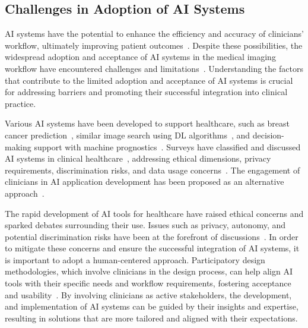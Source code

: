 \subsection{Challenges in Adoption of AI Systems}
\label{sec:chap004002002}

\ac{AI} systems have the potential to enhance the efficiency and accuracy of clinicians' workflow, ultimately improving patient outcomes~\cite{wallis2019artificial}.
Despite these possibilities, the widespread adoption and acceptance of \ac{AI} systems in the medical imaging workflow have encountered challenges and limitations~\cite{Fan2020}.
Understanding the factors that contribute to the limited adoption and acceptance of \ac{AI} systems is crucial for addressing barriers and promoting their successful integration into clinical practice.

Various \ac{AI} systems have been developed to support healthcare, such as breast cancer prediction~\cite{McKinney2020}, similar image search using \ac{DL} algorithms~\cite{10.1145/3290605.3300234}, and decision-making support with machine prognostics~\cite{10.1145/3290605.3300468}.
Surveys have classified and discussed \ac{AI} systems in clinical healthcare~\cite{CORONATO2020101964, LANGER2021106878, PELAU2021106855, STADIN2021106486}, addressing ethical dimensions, privacy requirements, discrimination risks, and data usage concerns~\cite{10.1145/3311957.3361858, PARK2021106795, DEANGELI2020102412}.
The engagement of clinicians in \ac{AI} application development has been proposed as an alternative approach~\cite{10.1145/3290605.3300234, CALISTO2021102607, Oh:2018:ILY:3173574.3174223, Sousa:2017:VVR:3025453.3025566}.

The rapid development of \ac{AI} tools for healthcare have raised ethical concerns and sparked debates surrounding their use.
Issues such as privacy, autonomy, and potential discrimination risks have been at the forefront of discussions~\cite{Fan2020, Sutton2020}.
In order to mitigate these concerns and ensure the successful integration of \ac{AI} systems, it is important to adopt a human-centered approach.
Participatory design methodologies, which involve clinicians in the design process, can help align \ac{AI} tools with their specific needs and workflow requirements, fostering acceptance and usability~\cite{CALISTO2021102607}.
By involving clinicians as active stakeholders, the development, and implementation of \ac{AI} systems can be guided by their insights and expertise, resulting in solutions that are more tailored and aligned with their expectations.

